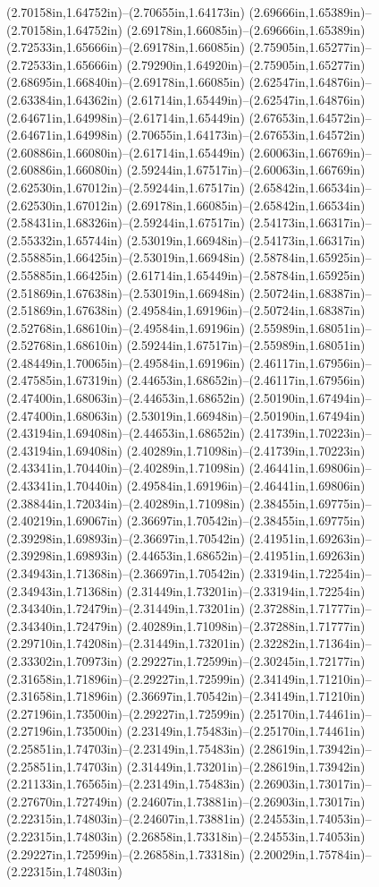 (2.70158in,1.64752in)--(2.70655in,1.64173in) (2.69666in,1.65389in)--(2.70158in,1.64752in) (2.69178in,1.66085in)--(2.69666in,1.65389in) (2.72533in,1.65666in)--(2.69178in,1.66085in) (2.75905in,1.65277in)--(2.72533in,1.65666in) (2.79290in,1.64920in)--(2.75905in,1.65277in) (2.68695in,1.66840in)--(2.69178in,1.66085in) (2.62547in,1.64876in)--(2.63384in,1.64362in) (2.61714in,1.65449in)--(2.62547in,1.64876in) (2.64671in,1.64998in)--(2.61714in,1.65449in) (2.67653in,1.64572in)--(2.64671in,1.64998in) (2.70655in,1.64173in)--(2.67653in,1.64572in) (2.60886in,1.66080in)--(2.61714in,1.65449in) (2.60063in,1.66769in)--(2.60886in,1.66080in) (2.59244in,1.67517in)--(2.60063in,1.66769in) (2.62530in,1.67012in)--(2.59244in,1.67517in) (2.65842in,1.66534in)--(2.62530in,1.67012in) (2.69178in,1.66085in)--(2.65842in,1.66534in) (2.58431in,1.68326in)--(2.59244in,1.67517in) (2.54173in,1.66317in)--(2.55332in,1.65744in) (2.53019in,1.66948in)--(2.54173in,1.66317in) (2.55885in,1.66425in)--(2.53019in,1.66948in) (2.58784in,1.65925in)--(2.55885in,1.66425in) (2.61714in,1.65449in)--(2.58784in,1.65925in) (2.51869in,1.67638in)--(2.53019in,1.66948in) (2.50724in,1.68387in)--(2.51869in,1.67638in) (2.49584in,1.69196in)--(2.50724in,1.68387in) (2.52768in,1.68610in)--(2.49584in,1.69196in) (2.55989in,1.68051in)--(2.52768in,1.68610in) (2.59244in,1.67517in)--(2.55989in,1.68051in) (2.48449in,1.70065in)--(2.49584in,1.69196in) (2.46117in,1.67956in)--(2.47585in,1.67319in) (2.44653in,1.68652in)--(2.46117in,1.67956in) (2.47400in,1.68063in)--(2.44653in,1.68652in) (2.50190in,1.67494in)--(2.47400in,1.68063in) (2.53019in,1.66948in)--(2.50190in,1.67494in) (2.43194in,1.69408in)--(2.44653in,1.68652in) (2.41739in,1.70223in)--(2.43194in,1.69408in) (2.40289in,1.71098in)--(2.41739in,1.70223in) (2.43341in,1.70440in)--(2.40289in,1.71098in) (2.46441in,1.69806in)--(2.43341in,1.70440in) (2.49584in,1.69196in)--(2.46441in,1.69806in) (2.38844in,1.72034in)--(2.40289in,1.71098in) (2.38455in,1.69775in)--(2.40219in,1.69067in) (2.36697in,1.70542in)--(2.38455in,1.69775in) (2.39298in,1.69893in)--(2.36697in,1.70542in) (2.41951in,1.69263in)--(2.39298in,1.69893in) (2.44653in,1.68652in)--(2.41951in,1.69263in) (2.34943in,1.71368in)--(2.36697in,1.70542in) (2.33194in,1.72254in)--(2.34943in,1.71368in) (2.31449in,1.73201in)--(2.33194in,1.72254in) (2.34340in,1.72479in)--(2.31449in,1.73201in) (2.37288in,1.71777in)--(2.34340in,1.72479in) (2.40289in,1.71098in)--(2.37288in,1.71777in) (2.29710in,1.74208in)--(2.31449in,1.73201in) (2.32282in,1.71364in)--(2.33302in,1.70973in) (2.29227in,1.72599in)--(2.30245in,1.72177in) (2.31658in,1.71896in)--(2.29227in,1.72599in) (2.34149in,1.71210in)--(2.31658in,1.71896in) (2.36697in,1.70542in)--(2.34149in,1.71210in) (2.27196in,1.73500in)--(2.29227in,1.72599in) (2.25170in,1.74461in)--(2.27196in,1.73500in) (2.23149in,1.75483in)--(2.25170in,1.74461in) (2.25851in,1.74703in)--(2.23149in,1.75483in) (2.28619in,1.73942in)--(2.25851in,1.74703in) (2.31449in,1.73201in)--(2.28619in,1.73942in) (2.21133in,1.76565in)--(2.23149in,1.75483in) (2.26903in,1.73017in)--(2.27670in,1.72749in) (2.24607in,1.73881in)--(2.26903in,1.73017in) (2.22315in,1.74803in)--(2.24607in,1.73881in) (2.24553in,1.74053in)--(2.22315in,1.74803in) (2.26858in,1.73318in)--(2.24553in,1.74053in) (2.29227in,1.72599in)--(2.26858in,1.73318in) (2.20029in,1.75784in)--(2.22315in,1.74803in) 
